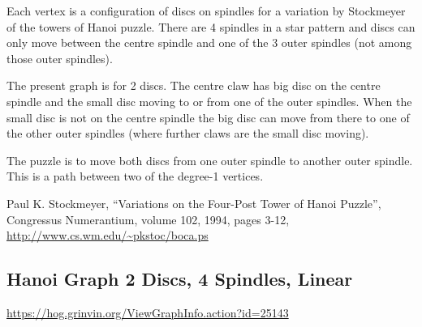 \documentclass{article}
\begin{document}
Each vertex is a configuration of discs on spindles for a variation by
Stockmeyer of the towers of Hanoi puzzle.  There are 4 spindles in a
star pattern and discs can only move between the centre spindle and
one of the 3 outer spindles (not among those outer spindles).

The present graph is for 2 discs.  The centre claw has big disc on the
centre spindle and the small disc moving to or from one of the outer
spindles.  When the small disc is not on the centre spindle the big
disc can move from there to one of the other outer spindles (where
further claws are the small disc moving).

The puzzle is to move both discs from one outer spindle to another outer
spindle.  This is a path between two of the degree\hyp{}1 vertices.

Paul K. Stockmeyer, ``Variations on the Four-Post Tower of Hanoi
Puzzle'', Congressus Numerantium, volume 102, 1994, pages 3-12,
\url{http://www.cs.wm.edu/~pkstoc/boca.ps}


\subsection{Hanoi Graph 2 Discs, 4 Spindles, Linear}

\url{https://hog.grinvin.org/ViewGraphInfo.action?id=25143}


\begin{center}
\end{center}
\end{document}

